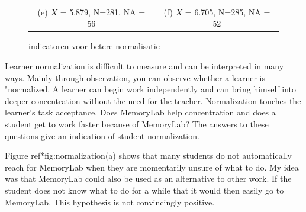 \documentclass[12pt, a4paper]{article}
\begin{document}
\begin{figure}
\begin{tabular}{cc}
    (e) $\overline{X}$ = 5.879, N=281, NA = 56 & (f) $\overline{X}$ = 6.705, N=285, NA = 52  
    \end{tabular}
    \caption{indicatoren voor betere normalisatie}
    \label{fig:normalisatie}
    \end{figure}
Learner normalization is difficult to measure and can be interpreted in many ways. Mainly through observation, you can observe whether a learner is "normalized. A learner can begin work independently and can bring himself into deeper concentration without the need for the teacher. Normalization touches the learner's task acceptance. Does MemoryLab help concentration and does a student get to work faster because of MemoryLab? The answers to these questions give an indication of student normalization.

Figure ref*{fig:normalization}(a) shows that many students do not automatically reach for MemoryLab when they are momentarily unsure of what to do. My idea was that MemoryLab could also be used as an alternative to other work. If the student does not know what to do for a while that it would then easily go to MemoryLab. This hypothesis is not convincingly positive.
\end{document}
